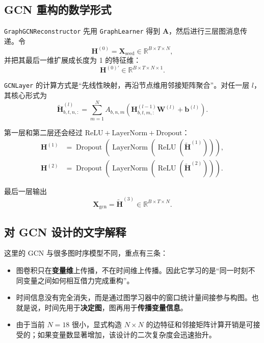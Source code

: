 \documentclass[UTF8]{ctexart}
\begin{document}
\subsection{GCN 重构的数学形式}

\texttt{GraphGCNReconstructor} 先用 \texttt{GraphLearner} 得到 \(\bm{A}\)，然后进行三层图消息传递。令
\begin{equation}
    \bm{H}^{(0)} = \bm{X}_{\text{seed}} \in \mathbb{R}^{B \times T \times N},
\end{equation}
并把其最后一维扩展成长度为 1 的特征维：
\begin{equation}
    \bm{H}^{(0)\prime} \in \mathbb{R}^{B \times T \times N \times 1}.
\end{equation}

\texttt{GCNLayer} 的计算方式是“先线性映射，再沿节点维用邻接矩阵聚合”。对任一层 \(l\)，其核心形式为
\begin{equation}
    \tilde{\bm{H}}^{(l)}_{b,t,n,:}
    =
    \sum_{m=1}^{N}
    A_{b,n,m}
    \left(
        \bm{H}^{(l-1)}_{b,t,m,:}\bm{W}^{(l)} + \bm{b}^{(l)}
    \right).
\end{equation}

第一层和第二层还会经过 \(\text{ReLU} + \text{LayerNorm} + \text{Dropout}\)：
\begin{align}
    \bm{H}^{(1)} &= \operatorname{Dropout}\!\left(
        \operatorname{LayerNorm}\!\left(
            \operatorname{ReLU}(\tilde{\bm{H}}^{(1)})
        \right)
    \right), \\
    \bm{H}^{(2)} &= \operatorname{Dropout}\!\left(
        \operatorname{LayerNorm}\!\left(
            \operatorname{ReLU}(\tilde{\bm{H}}^{(2)})
        \right)
    \right).
\end{align}

最后一层输出
\begin{equation}
    \bm{X}_{\text{gcn}} = \tilde{\bm{H}}^{(3)} \in \mathbb{R}^{B \times T \times N}.
\end{equation}

\subsection{对 GCN 设计的文字解释}

这里的 GCN 与很多图时序模型不同，重点有三条：
\begin{itemize}
    \item 图卷积只在\textbf{变量维}上传播，不在时间维上传播。因此它学习的是“同一时刻不同变量之间如何相互借力完成重构”。
    \item 时间信息没有完全消失，而是通过图学习器中的窗口统计量间接参与构图。也就是说，时间先用于\textbf{决定图}，图再用于\textbf{传播变量信息}。
    \item 由于当前 \(N=18\) 很小，显式构造 \(N \times N\) 的边特征和邻接矩阵计算开销是可接受的；如果变量数显著增加，该设计的二次复杂度会迅速抬升。
\end{itemize}
\end{document}
